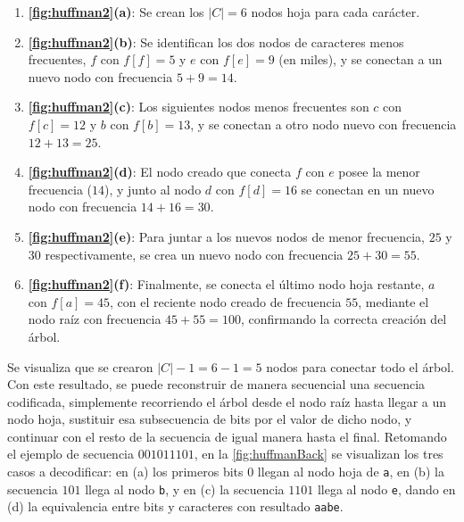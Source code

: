 \begin{enumerate}
	\item \textbf{\autoref{fig:huffman2}(a)}: Se crean los $|C| = 6$ nodos hoja para cada carácter.
	\item \textbf{\autoref{fig:huffman2}(b)}: Se identifican los dos nodos de caracteres menos frecuentes, $f$ con $f[f] = 5$ y $e$ con $f[e] = 9$ (en miles), y se conectan a un nuevo nodo con frecuencia $5 + 9 = 14$.
	\item \textbf{\autoref{fig:huffman2}(c)}: Los siguientes nodos menos frecuentes son $c$ con $f[c] = 12$ y $b$ con $f[b] = 13$, y se conectan a otro nodo nuevo con frecuencia $12 + 13 = 25$.
	\item \textbf{\autoref{fig:huffman2}(d)}: El nodo creado que conecta $f$ con $e$ posee la menor frecuencia ($14$), y junto al nodo $d$ con $f[d] = 16$ se conectan en un nuevo nodo con frecuencia $14 + 16 = 30$.
	\item \textbf{\autoref{fig:huffman2}(e)}: Para juntar a los nuevos nodos de menor frecuencia, $25$ y $30$ respectivamente, se crea un nuevo nodo con frecuencia $25 + 30 = 55$.
	\item \textbf{\autoref{fig:huffman2}(f)}: Finalmente, se conecta el último nodo hoja restante, $a$ con $f[a] = 45$, con el reciente nodo creado de frecuencia $55$, mediante el nodo raíz con frecuencia $45 + 55 = 100$, confirmando la correcta creación del árbol.
\end{enumerate}

Se visualiza que se crearon $|C| - 1 = 6 - 1 = 5$ nodos para conectar todo el árbol. Con este resultado, se puede reconstruir de manera secuencial una secuencia codificada, simplemente recorriendo el árbol desde el nodo raíz hasta llegar a un nodo hoja, sustituir esa subsecuencia de bits por el valor de dicho nodo, y continuar con el resto de la secuencia de igual manera hasta el final. Retomando el ejemplo de secuencia $001011101$, en la \autoref{fig:huffmanBack} se visualizan los tres casos a decodificar: en (a) los primeros bits $0$ llegan al nodo hoja de \texttt{a}, en (b) la secuencia $101$ llega al nodo \texttt{b}, y en (c) la secuencia $1101$ llega al nodo \texttt{e}, dando en (d) la equivalencia entre bits y caracteres con resultado \texttt{aabe}.





